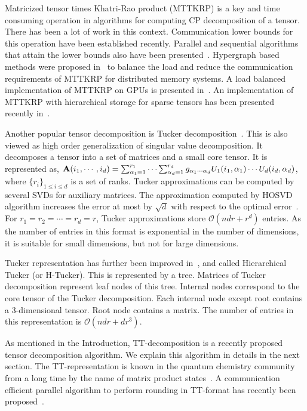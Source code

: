 \documentclass[runningheads]{llncs}
\newcommand{\tensor}[1]{{\cal\textbf{#1}\xspace}}
\begin{document}
Matricized tensor times Khatri-Rao product (MTTKRP) is a key and time consuming operation in algorithms for computing CP decomposition of a tensor. There has been a lot of work in this context. Communication lower bounds for this operation have been established recently. Parallel and sequential algorithms that attain the lower bounds also have been presented~\cite{mttkrp-lowerbound}. Hypergraph based methods were proposed in~\cite{Kaya-SC-15} to balance the load and reduce the communication requirements of MTTKRP for distributed memory systems. A load balanced implementation of MTTKRP on GPUs is presented in~\cite{mttkrp-gpu}. An implementation of MTTKRP with hierarchical storage for sparse tensors has been presented recently in~\cite{hicoo}. 


Another popular tensor decomposition is Tucker decomposition~\cite{tucker-decomposition}. This is also viewed as high order generalization of singular value decomposition. It decomposes a tensor into a set of matrices and a small core tensor. It is represented as, $\tensor{A}(i_1,\cdots,i_d) = \sum_{\alpha_1=1}^{r_1}\cdots\sum_{\alpha_d=1}^{r_d} g_{\alpha_1\cdots\alpha_d}U_1(i_1,\alpha_1)\cdots U_d(i_d, \alpha_d)$, where $\{ r_i \}_{1 \leq i \leq d}$ is a set of ranks. Tucker approximations can be computed by several SVDs for auxiliary matrices. The approximation computed by HOSVD algorithm increases the error at most by $\sqrt{d}$ with respect to the optimal error~\cite{hosvd-quasi-optimality}. For $r_1=r_2=\cdots =r_d=r$, Tucker approximations store $\mathcal{O}(ndr+r^d)$ entries. As the number of entries in this format is exponential in the number of dimensions, it is suitable for small dimensions, but not for large dimensions.

Tucker representation has further been improved 
in~\cite{h-tucker-Hackbusch_2009,h-tucker-Grasedyck}, and called 
Hierarchical Tucker (or H-Tucker). This is represented by a tree. Matrices of 
Tucker decomposition represent leaf nodes of this tree. Internal nodes 
correspond to the core tensor of the Tucker decomposition. Each internal 
node except root contains a $3$-dimensional tensor. Root node 
contains a matrix. The number of entries in this representation is 
$\mathcal{O}(ndr+dr^3)$.

As mentioned in the Introduction, TT-decomposition is a recently proposed tensor decomposition algorithm.
We explain this algorithm in details in the next section. The TT-representation is known in the quantum chemistry community from a long time by the name of  matrix product states~\cite{mpsformat}. A communication efficient parallel algorithm to perform rounding in TT-format has recently been proposed~\cite{ballard2019}. 
\end{document}
